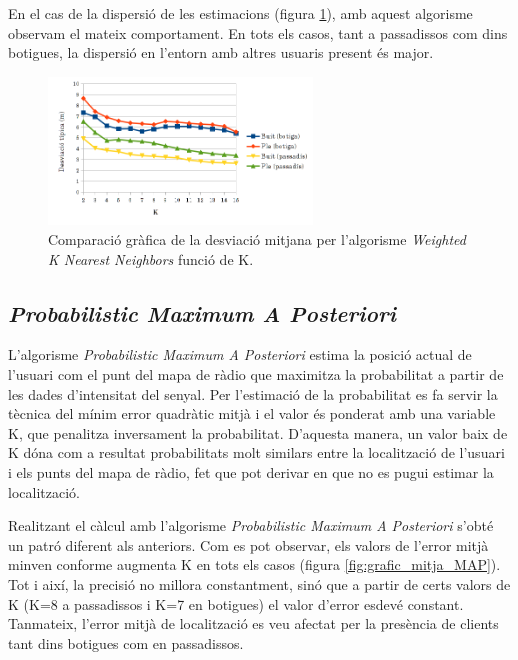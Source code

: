 En el cas de la dispersió de les estimacions (figura \ref{fig:grafic_desviacio_WKNN}), amb aquest algorisme observam el mateix comportament. En tots els casos, tant a passadissos com dins botigues, la dispersió en l'entorn amb altres usuaris present és major. 

\begin{figure}[ht]
\begin{center}
\includegraphics[width=7cm]{imatges/wknn_desviacio.png}
\caption{Comparació gràfica de la desviació mitjana per l'algorisme \textit{Weighted K Nearest Neighbors} funció de K.}
\label{fig:grafic_desviacio_WKNN}
\end{center}
\end{figure}

\subsection{\textit{Probabilistic Maximum A Posteriori}}

L'algorisme \textit{Probabilistic Maximum A Posteriori} estima la posició actual de l'usuari com el punt del mapa de ràdio que maximitza la probabilitat a partir de les dades d'intensitat del senyal. Per l'estimació de la probabilitat es fa servir la tècnica del mínim error quadràtic mitjà i el valor és ponderat amb una variable K, que penalitza inversament la probabilitat. D'aquesta manera, un valor baix de K dóna com a resultat probabilitats molt similars entre la localització de l'usuari i els punts del mapa de ràdio, fet que pot derivar en que no es pugui estimar la localització.

Realitzant el càlcul amb l'algorisme \textit{Probabilistic Maximum A Posteriori} s'obté un patró diferent als anteriors. Com es pot observar, els valors de l'error mitjà minven conforme augmenta K en tots els casos (figura \ref{fig:grafic_mitja_MAP}). Tot i així, la precisió no millora constantment, sinó que a partir de certs valors de K (K=8 a passadissos i K=7 en botigues) el valor d'error esdevé constant. Tanmateix, l'error mitjà de localització es veu afectat per la presència de clients tant dins botigues com en passadissos.

